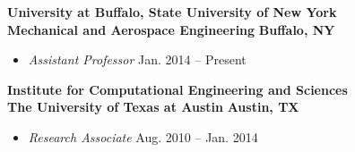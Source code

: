 \textbf{University at Buffalo, State University of New York}\\
\textbf{Mechanical and Aerospace Engineering} \hfill \textbf{Buffalo, NY}
%
\begin{itemize}
\item[] \textit{Assistant Professor} \hfill Jan. 2014 -- Present
\end{itemize}

\textbf{Institute for Computational Engineering and Sciences}\\
\textbf{The University of Texas at Austin} \hfill \textbf{Austin, TX}
%
\begin{itemize}
\item[] \textit{Research Associate} \hfill Aug. 2010 -- Jan. 2014

\end{itemize}
